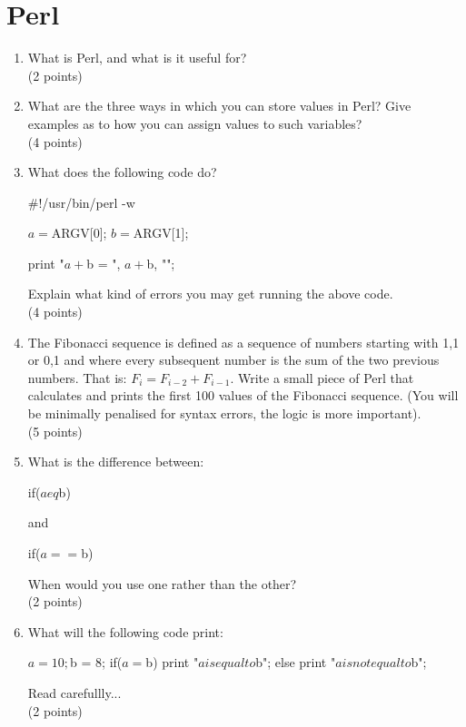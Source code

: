 \documentclass[11pt]{article}
\begin{document}
\section{Perl}
\begin{enumerate}
\item What is Perl, and what is it useful for?\\
  (2 points)
\item What are the three ways in which you can store values in Perl? Give
  examples as to how you can assign values to such variables?\\
  (4 points)
\item What does the following code do?

  \begin{perlcode}
  #!/usr/bin/perl -w
    
  $a = $ARGV[0];
  $b = $ARGV[1];

  print "$a + $b = ", $a + $b, "\n";
  \end{perlcode}
  Explain what kind of errors you may get running the above code.\\
  (4 points)
\item 
  The Fibonacci sequence is defined as a sequence of numbers starting
  with 1,1 or 0,1 and where every subsequent number is the sum of the two
  previous numbers. That is: $F_i = F_{i-2} + F_{i-1}$. Write a small piece
  of Perl that calculates and prints the first 100 values of the Fibonacci
  sequence. (You will be minimally penalised for syntax errors, the logic is
  more important).\\
  (5 points)
\item What is the difference between:

  \begin{perlcode}
  if($a eq $b)
  \end{perlcode}
  and

  \begin{perlcode}
  if($a == $b)
  \end{perlcode}
  When would you use one rather than the other?\\
  (2 points)
\item What will the following code print:

  \begin{perlcode}
  $a = 10;
  $b = 8;
  if($a = $b){
    print "$a is equal to $b\n";
  }else{
    print "$a is not equal to $b\n";
  }
  \end{perlcode}
  Read carefullly...\\
  (2 points)
\end{enumerate}
\end{document}
